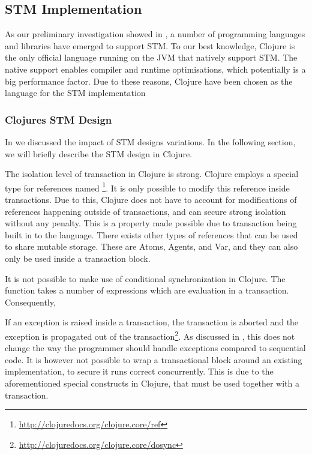 \subsection{\ac{STM} Implementation}
As our preliminary investigation showed in , a number of programming languages and libraries have emerged to support \ac{STM}. To our best knowledge, Clojure is the only official language running on the \ac{JVM} that natively support \ac{STM}. The native support enables compiler and runtime optimisations, which potentially is a big performance factor. Due to these reasons, Clojure have been chosen as the language for the \ac{STM} implementation

\subsubsection{Clojures \acs{STM} Design}
In  we discussed the impact of \ac{STM} designs variations. In the following section, we will briefly describe the \ac{STM} design in Clojure.

The isolation level of transaction in Clojure is strong. Clojure employs a special type for references named \footnote{\url{http://clojuredocs.org/clojure.core/ref}}. It is only possible to modify this reference  inside transactions. Due to this, Clojure does not have to account for modifications of references happening outside of transactions, and can secure strong isolation without any penalty. This is a property made possible due to transaction being built in to the language. There exists other types of references that can be used to share mutable storage. These are Atoms, Agents, and Var, and they can also only be used inside a transaction block.

It is not possible to make use of conditional synchronization in Clojure. The  function takes a number of expressions which are evaluation in a transaction. Consequently, 

If an exception is raised inside a transaction, the transaction is aborted and the exception is propagated out of the transaction\footnote{\url{http://clojuredocs.org/clojure.core/dosync}}. As discussed in , this does not change the way the programmer should handle exceptions compared to sequential code. It is however not possible to wrap a transactional block around an existing implementation, to secure it runs correct concurrently. This is due to the aforementioned special constructs in Clojure, that must be used together with a transaction.

